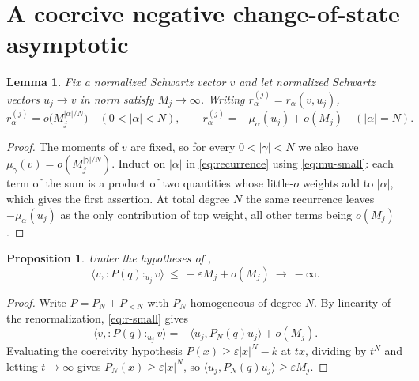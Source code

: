\documentclass[11pt,reqno]{amsart}
\theoremstyle{plain}
\newtheorem{lemma}[theorem]{Lemma}
\newtheorem{proposition}[theorem]{Proposition}
\theoremstyle{definition}
\theoremstyle{remark}
\numberwithin{equation}{section}
\begin{document}
\section{A coercive negative change-of-state asymptotic}
\label{sec:coercive}

\begin{lemma}
  \label{lem:r-asymptotics}
  Fix a normalized Schwartz vector $v$ and let normalized Schwartz vectors
  $u_j\to v$ in norm satisfy $M_j\to\infty$. Writing
  $r_\alpha^{(j)}=r_\alpha(v,u_j)$,
  \begin{equation}
    \label{eq:r-small}
    r_\alpha^{(j)}=o\bigl(M_j^{|\alpha|/N}\bigr)
    \quad(0<|\alpha|<N),
    \qquad
    r_\alpha^{(j)}=-\mu_\alpha(u_j)+o(M_j)
    \quad(|\alpha|=N).
  \end{equation}
\end{lemma}

\begin{proof}
  The moments of $v$ are fixed, so for every $0<|\gamma|<N$ we also have
  $\mu_\gamma(v)=o(M_j^{|\gamma|/N})$. Induct on $|\alpha|$ in
  \eqref{eq:recurrence} using \eqref{eq:mu-small}: each term of the sum is a
  product of two quantities whose little-$o$ weights add to $|\alpha|$, which
  gives the first assertion. At total degree $N$ the same recurrence leaves
  $-\mu_\alpha(u_j)$ as the only contribution of top weight, all other terms
  being $o(M_j)$.
\end{proof}

\begin{proposition}
  \label{prop:to-minus-infinity}
  Under the hypotheses of ,
  \begin{equation}
    \label{eq:blowdown}
    \langle v,:P(q):_{u_j}v\rangle\ \le\ -\varepsilon M_j+o(M_j)
    \ \longrightarrow\ -\infty .
  \end{equation}
\end{proposition}

\begin{proof}
  Write $P=P_N+P_{<N}$ with $P_N$ homogeneous of degree $N$. By linearity of
  the renormalization, \eqref{eq:r-small} gives
  \begin{equation}
    \label{eq:leading}
    \langle v,:P(q):_{u_j}v\rangle
    =-\langle u_j,P_N(q)u_j\rangle+o(M_j).
  \end{equation}
  Evaluating the coercivity hypothesis $P(x)\ge\varepsilon|x|^N-k$ at $tx$,
  dividing by $t^N$ and letting $t\to\infty$ gives
  $P_N(x)\ge\varepsilon|x|^N$, so
  $\langle u_j,P_N(q)u_j\rangle\ge\varepsilon M_j$.
\end{proof}
\end{document}
